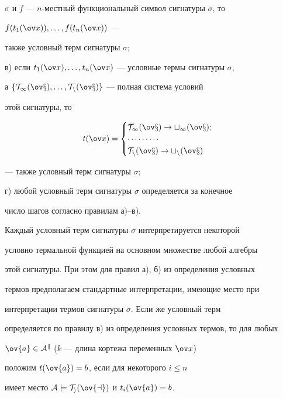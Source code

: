 $\sigma$ и $f$ --- $n$-местный функциональный символ сигнатуры $\sigma$, то


$f(t_1(\x)),\dots,f(t_n(\x))$ ---


также условный терм сигнатуры $\sigma$;





в) если $t_1(\x),\dotsc,t_n(\x)$ --- условные термы сигнатуры $\sigma$,


а $\{\T_1(\x),\dotsc,\T_n(\x)\}$ --- полная система условий


этой сигнатуры, то


$$


t(\x)=\begin{cases}


\T_1(\x) \to  t_1(\x); \\


\dotsb \dotsb \dotsb \\


\T_n(\x) \to t_n(\x)


\end{cases}


$$


--- также условный терм сигнатуры $\sigma$;





г) любой условный терм сигнатуры $\sigma$ определяется за конечное


число шагов согласно правилам а)--в).





Каждый условный терм сигнатуры $\sigma$ интерпретируется некоторой


условно термальной функцией на основном множестве любой алгебры


этой сигнатуры. При этом для правил а), б) из определения условных


термов предполагаем стандартные интерпретации, имеющие место при


интерпретации термов сигнатуры $\sigma$. Если же условный терм


определяется по правилу в) из определения условных термов, то для любых


$\ov{a}\in \A^k$ ($k$ --- длина кортежа переменных $\x$)


положим $t(\ov{a})=b$, если для некоторого $i\leq n$


имеет место $\A\models \T_i(\ov{a})$ и $t_i(\ov{a})=b$.






